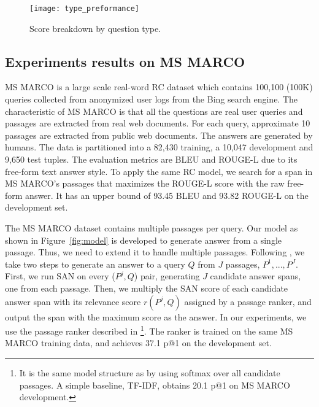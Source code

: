 \documentclass[11pt,a4paper]{article}
\begin{document}
\begin{figure}[t!]
\centering
\texttt{[image: type\_preformance]}
\caption{\label{fig:dev_f1}Score breakdown by question type.}
\end{figure}

\subsection{Experiments results on MS MARCO}
MS MARCO \cite{nguyen2016ms} is a large scale real-word RC dataset which contains 100,100 (100K) queries collected from anonymized user logs from the Bing search engine. The characteristic of MS MARCO is that  all the questions are real user queries and passages are extracted from real web documents. For each query, approximate 10 passages are extracted from public web documents. The answers are generated by humans. The data is partitioned into a 82,430 training, a 10,047 development and 9,650 test tuples. The evaluation metrics are BLEU\cite{papineni2002bleu} and ROUGE-L \cite{lin2004rouge} due to its free-form text answer style. To apply the same RC model, we search for a span in MS MARCO's passages that maximizes the ROUGE-L score with the raw free-form answer. It has an upper bound of 93.45 BLEU and 93.82 ROUGE-L on the development set. 

The MS MARCO dataset contains multiple passages per query. Our model as shown in Figure~\ref{fig:model} is developed to generate answer from a single passage. Thus, we need to extend it to handle multiple passages. Following \cite{shen2017empirical}, we take two steps to generate an answer to a query $Q$ from $J$ passages, $P^1, ..., P^J$. First, we run SAN on every ($P^j, Q$) pair, generating $J$ candidate answer spans, one from each passage. Then, we multiply the SAN score of each candidate answer span with its relevance score $r(P^j, Q)$ assigned by a passage ranker, and output the span with the maximum score as the answer. In our experiments, we use the passage ranker described in \cite{liu2018stochastic}\footnote{It is the same model structure as \cite{liu2018stochastic} by using softmax over all candidate passages. A simple baseline, TF-IDF, obtains 20.1 p@1 on MS MARCO development.}. The ranker is trained on the same MS MARCO training data, and achieves 37.1 p@1 on the development set.
\end{document}
